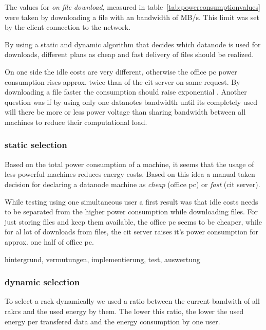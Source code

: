The values for \textit{on file download}, measured in table~\ref{tab:powerconsumptionvalues} were taken by downloading a file with an bandwidth of  MB/s. This limit was set by the client connection to the network.

By using a static and dynamic algorithm that decides which datanode is used for downloads, different plans as cheap and fast delivery of files should be realized.

On one side the idle costs are very different, otherwise the office pc power consumption rises approx. twice than of the cit server on same request. By downloading a file faster the consumption should raise exponential . Another question was if by using only one datanotes bandwidth until its completely used will there be more or less power voltage than sharing bandwidth between all machines to reduce their computational load. 

\subsubsection{static selection}

Based on the total power consumption of a machine, it seems that the usage of less powerful machines reduces energy costs. Based on this idea a manual taken decision for declaring a datanode machine as \textit{cheap} (office pc) or \textit{fast} (cit server). 

While testing using one simultaneous user a first result was that idle costs needs to be separated from the higher power consumption while downloading files. For just storing files and keep them available, the office pc seems to be cheaper, while for al lot of downloads from files, the cit server raises it's power consumption for approx. one half of office pc.



hintergrund, vermutungen, implementierung, test, auswertung

\subsubsection{dynamic selection}

To select a rack dynamically we used a ratio between the current bandwith of all rakcs and the used energy by them. The lower this ratio, the lower the used energy per transfered data and the energy consumption by one user.

